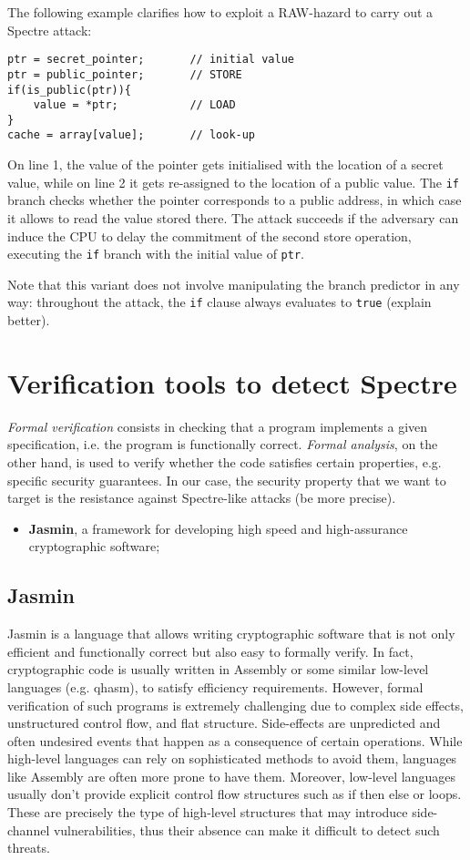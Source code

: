 \documentclass[12pt,a4paper]{book}
\theoremstyle{definition}
\begin{document}
	The following example clarifies how to exploit a RAW-hazard to carry out a Spectre attack:
	\begin{lstlisting}
ptr = secret_pointer;		// initial value
ptr = public_pointer;		// STORE
if(is_public(ptr)){	
	value = *ptr;			// LOAD
}
cache = array[value];		// look-up
	\end{lstlisting}
	On line 1, the value of the pointer gets initialised with the location of a secret value, while on line 2 it gets re-assigned to the location of a public value. The \texttt{if} branch checks whether the pointer corresponds to a public address, in which case it allows to read the value stored there. The attack succeeds if the adversary can induce the CPU to delay the commitment of the second store operation, executing the \texttt{if} branch with the initial value of \texttt{ptr}.
	
	Note that this variant does not involve manipulating the branch predictor in any way: throughout the attack, the \texttt{if} clause always evaluates to \texttt{true} (explain better).

	\chapter{Verification tools to detect Spectre}
	
	\textit{Formal verification} consists in checking that a program implements a given specification, i.e. the program is functionally correct. \textit{Formal analysis}, on the other hand, is used to verify whether the code satisfies certain properties, e.g. specific security guarantees. In our case, the security property that we want to target is the resistance against Spectre-like attacks (be more precise). 
	\begin{itemize}
		\item \textbf{Jasmin}\cite{Almeida2017}, a framework for developing high speed and high-assurance cryptographic software;
	\end{itemize}
	
	\section{Jasmin}
	Jasmin is a language that allows writing cryptographic software that is not only efficient and functionally correct but also easy to formally verify. In fact, cryptographic code is usually written in Assembly or some similar low-level languages (e.g. \textsf{qhasm}), to satisfy efficiency requirements. However, formal verification of such programs is extremely challenging due to complex side effects, unstructured control flow, and flat structure. Side-effects are unpredicted and often undesired events that happen as a consequence of certain operations. While high-level languages can rely on sophisticated methods to avoid them, languages like Assembly are often more prone to have them. Moreover, low-level languages usually don't provide explicit control flow structures such as if then else or loops. These are precisely the type of high-level structures that may introduce side-channel vulnerabilities, thus their absence can make it difficult to detect such threats. 
	
\end{document}
